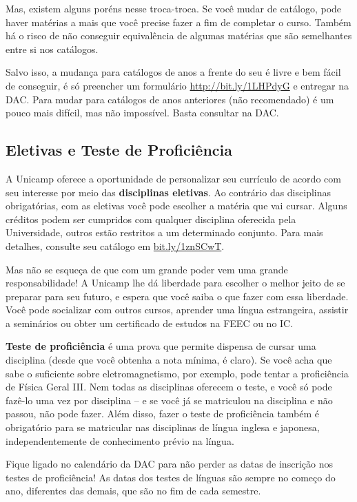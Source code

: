 Mas, existem alguns poréns nesse troca-troca. Se você mudar de catálogo, pode
haver matérias a mais que você precise fazer a fim de completar o curso. Também
há o risco de não conseguir equivalência de algumas matérias que são semelhantes
entre si nos catálogos.

Salvo isso, a mudança para catálogos de anos a frente do seu é livre e bem fácil
de conseguir, é só preencher um formulário \url{http://bit.ly/1LHPdyG} e
entregar na DAC. Para mudar para catálogos de anos anteriores (não recomendado)
é um pouco mais difícil, mas não impossível. Basta consultar na DAC.

\subsection{Eletivas e Teste de Proficiência}

A Unicamp oferece a oportunidade de personalizar seu currículo de acordo com seu
interesse por meio das \textbf{disciplinas eletivas}. Ao contrário das
disciplinas obrigatórias, com as eletivas você pode escolher a matéria que vai
cursar. Alguns créditos podem ser cumpridos com qualquer disciplina oferecida
pela Universidade, outros estão restritos a um determinado conjunto. Para mais
detalhes, consulte seu catálogo em \url{bit.ly/1znSCwT}.

Mas não se esqueça de que com um grande poder vem uma grande responsabilidade!
A Unicamp lhe dá liberdade para escolher o melhor jeito de se preparar para seu
futuro, e espera que você saiba o que fazer com essa liberdade. Você pode
socializar com outros cursos, aprender uma língua estrangeira, assistir a
seminários ou obter um certificado de estudos na FEEC ou no IC.

\textbf{Teste de proficiência} é uma prova que permite dispensa de cursar uma
disciplina (desde que você obtenha a nota mínima, é claro). Se você acha que
sabe o suficiente sobre eletromagnetismo, por exemplo, pode tentar a
proficiência de Física Geral III.  Nem todas as disciplinas oferecem o teste, e
você só pode fazê-lo uma vez por disciplina -- e se você já se matriculou na
disciplina e não passou, não pode fazer.  Além disso, fazer o teste de
proficiência também é obrigatório para se matricular nas disciplinas de língua
inglesa e japonesa, independentemente de conhecimento prévio na língua.

Fique ligado no calendário da DAC para não perder as datas de inscrição nos
testes de proficiência! As datas dos testes de línguas são sempre no começo do
ano, diferentes das demais, que são no fim de cada semestre.


